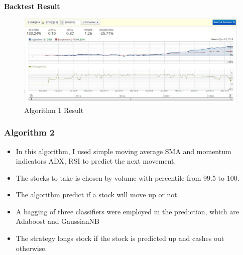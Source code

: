 \documentclass[11pt]{article}
\makeatletter
\def\maxwidth{\ifdim\Gin@nat@width>\linewidth\linewidth
    \else\Gin@nat@width\fi}
\let\Oldincludegraphics\includegraphics
\renewcommand{\includegraphics}[1]{\Oldincludegraphics[width=.8\maxwidth]{#1}}
\providecommand{\tightlist}{%
      \setlength{\itemsep}{0pt}\setlength{\parskip}{0pt}}
\makeatother
\begin{document}
    \textbf{Backtest Result}

    \begin{figure}
\centering
\includegraphics{img/Machine_Learning_1.png}
\caption{Algorithm 1 Result}
\end{figure}

    \subsubsection{Algorithm 2}\label{algorithm-2}

    \begin{itemize}
\tightlist
\item
  In this algorithm, I used simple moving average SMA and momentum
  indicators ADX, RSI to predict the next movement.
\item
  The stocks to take is chosen by volume with percentile from 99.5 to
  100.
\item
  The algorithm predict if a stock will move up or not.
\item
  A bagging of three classifiers were employed in the prediction, which
  are Adaboost and GaussianNB
\item
  The strategy longs stock if the stock is predicted up and cashes out
  otherwise.
\end{itemize}
\end{document}

